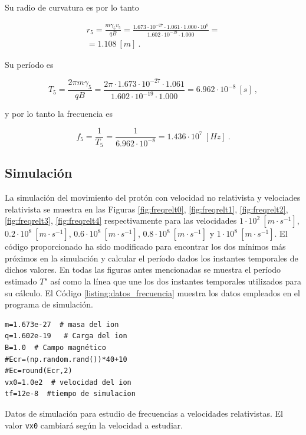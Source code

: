\documentclass[journal]{IEEEtran}
\newenvironment{code}{\captionsetup{type=listing}}{\par\addvspace{\baselineskip}}
\begin{document}
Su radio de curvatura es por lo tanto

\begin{align}
r_5 = \displaystyle\frac{m\gamma_5v_5}{qB} = \displaystyle\frac{1.673\cdot 10^{-27}\cdot 1.061 \cdot 1.000\cdot 10^8}{1.602\cdot 10^{-19}\cdot 1.000} = \\
= 1.108~[m]~.
\end{align}

Su período es

\begin{equation}
T_5 = \displaystyle\frac{2\pi m\gamma_5}{qB} = \displaystyle\frac{2\pi \cdot 1.673\cdot 10^{-27}\cdot 1.061}{1.602\cdot 10^{-19}\cdot 1.000} = 6.962\cdot 10^{-8}~[s]~,
\end{equation}

y por lo tanto la frecuencia es

\begin{equation}
f_5 = \displaystyle\frac{1}{T_5} = \displaystyle\frac{1}{6.962\cdot 10^{-8}} = 1.436\cdot 10^7~[Hz]~.
\end{equation}

\subsection{Simulación}

La simulación del movimiento del protón con velocidad no relativista y velociades relativista se muestra en las Figuras \ref{fig:freqrelt0}, \ref{fig:freqrelt1}, \ref{fig:freqrelt2}, \ref{fig:freqrelt3}, \ref{fig:freqrelt4} respectivamente para las velocidades $1\cdot 10^2~[m\cdot s^{-1}]$, $0.2\cdot 10^8~[m\cdot s^{-1}]$, $0.6\cdot 10^8~[m\cdot s^{-1}]$, $0.8\cdot 10^8~[m\cdot s^{-1}]$ y $1\cdot 10^8~[m\cdot s^{-1}]$. El código proporcionado ha sido modificado para encontrar los dos mínimos más próximos en la simulación y calcular el período dados los instantes temporales de dichos valores. En todas las figuras antes mencionadas se muestra el período estimado $T^s$ así como la línea que une los dos instantes temporales utilizados para su cálculo. El Código \ref{listing:datos_frecuencia} muestra los datos empleados en el programa de simulación.

\bigskip

\begin{code}
    \begin{verbatim}
m=1.673e-27  # masa del ion
q=1.602e-19   # Carga del ion
B=1.0  # Campo magnético
#Ecr=(np.random.rand())*40+10
#Ec=round(Ecr,2)
vx0=1.0e2  # velocidad del ion
tf=12e-8  #tiempo de simulacion
    \end{verbatim}
    \caption{Datos de simulación para estudio de frecuencias a velocidades relativistas. El valor \texttt{vx0} cambiará según la velocidad a estudiar.}
    \label{listing:datos_frecuencia}
\end{code}
\end{document}
